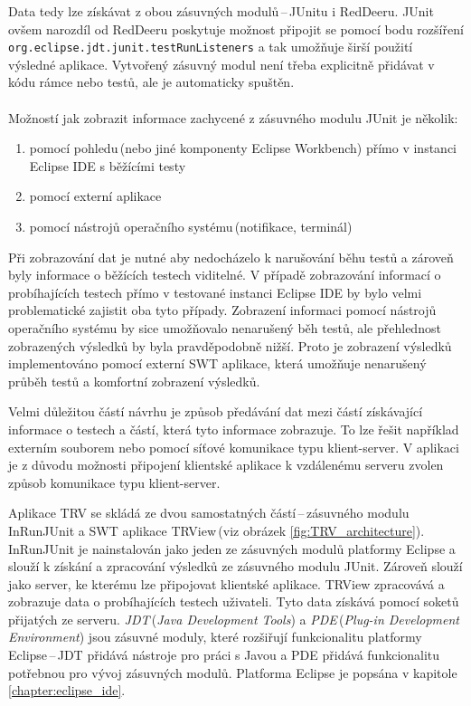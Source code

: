   Data tedy lze získávat z obou zásuvných modulů\,--\,JUnitu i RedDeeru. JUnit ovšem narozdíl od RedDeeru poskytuje možnost připojit se pomocí bodu rozšíření\\\texttt{org.eclipse.jdt.junit.testRunListeners} a tak umožňuje širší použití výsledné aplikace. Vytvořený zásuvný modul není třeba explicitně přidávat v kódu rámce nebo testů, ale je automaticky spuštěn.
  \\
  \\
  \noindent
  Možností jak zobrazit informace zachycené z zásuvného modulu JUnit je několik:
  \begin{enumerate}
   \item pomocí pohledu\,(nebo jiné komponenty Eclipse Workbench) přímo v instanci Eclipse IDE s běžícími testy
   \item pomocí externí aplikace
   \item pomocí nástrojů operačního systému\,(notifikace, terminál)
  \end{enumerate}

  Při zobrazování dat je nutné aby nedocházelo k narušování běhu testů a zároveň byly informace o běžících testech viditelné. V případě zobrazování informací o probíhajících testech přímo v testované instanci Eclipse IDE by bylo velmi problematické zajistit oba tyto případy. Zobrazení informaci pomocí nástrojů operačního systému by sice umožňovalo nenarušený běh testů, ale přehlednost zobrazených výsledků by byla pravděpodobně nižší. Proto je zobrazení výsledků implementováno pomocí externí SWT aplikace, která umožňuje nenarušený průběh testů a komfortní zobrazení výsledků.

  Velmi důležitou částí návrhu je způsob předávání dat mezi částí získávající informace o testech a částí, která tyto informace zobrazuje. To lze řešit například externím souborem nebo pomocí síťové komunikace typu klient-server. V aplikaci je z důvodu možnosti připojení klientské aplikace k vzdálenému serveru zvolen způsob komunikace typu klient-server.

  Aplikace TRV se skládá ze dvou samostatných částí\,--\,zásuvného modulu InRunJUnit a SWT aplikace TRView\,(viz obrázek \ref{fig:TRV_architecture}). InRunJUnit je nainstalován jako jeden ze zásuvných modulů platformy Eclipse a slouží k získání a zpracování výsledků ze zásuvného modulu JUnit. Zároveň slouží jako server, ke kterému lze připojovat klientské aplikace. TRView zpracovává a zobrazuje data o probíhajících testech uživateli. Tyto data získává pomocí soketů přijatých ze serveru. \emph{JDT}\,(\emph{Java Development Tools}) a \emph{PDE}\,(\emph{Plug-in Development Environment}) jsou zásuvné moduly, které rozšiřují funkcionalitu platformy Eclipse\,--\,JDT přidává nástroje pro práci s Javou a PDE přidává funkcionalitu potřebnou pro vývoj zásuvných modulů. Platforma Eclipse je popsána v kapitole \ref{chapter:eclipse_ide}.

